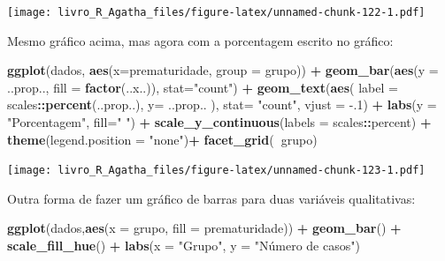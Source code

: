 \documentclass[
]{book}
\newenvironment{Shaded}{\begin{snugshade}}{\end{snugshade}}
\newcommand{\DataTypeTok}[1]{\textcolor[rgb]{0.13,0.29,0.53}{#1}}
\newcommand{\FloatTok}[1]{\textcolor[rgb]{0.00,0.00,0.81}{#1}}
\newcommand{\KeywordTok}[1]{\textcolor[rgb]{0.13,0.29,0.53}{\textbf{#1}}}
\newcommand{\NormalTok}[1]{#1}
\newcommand{\OperatorTok}[1]{\textcolor[rgb]{0.81,0.36,0.00}{\textbf{#1}}}
\newcommand{\StringTok}[1]{\textcolor[rgb]{0.31,0.60,0.02}{#1}}
\begin{document}
\texttt{[image: livro\_R\_Agatha\_files/figure-latex/unnamed-chunk-122-1.pdf]}

Mesmo gráfico acima, mas agora com a porcentagem escrito no gráfico:

\begin{Shaded}
\begin{Highlighting}[]
\KeywordTok{ggplot}\NormalTok{(dados, }\KeywordTok{aes}\NormalTok{(}\DataTypeTok{x=}\NormalTok{prematuridade, }\DataTypeTok{group =}\NormalTok{ grupo))  }\OperatorTok{+}\StringTok{ }
\StringTok{  }\KeywordTok{geom_bar}\NormalTok{(}\KeywordTok{aes}\NormalTok{(}\DataTypeTok{y =}\NormalTok{ ..prop.., }\DataTypeTok{fill =} \KeywordTok{factor}\NormalTok{(..x..)), }\DataTypeTok{stat=}\StringTok{"count"}\NormalTok{) }\OperatorTok{+}
\StringTok{  }\KeywordTok{geom_text}\NormalTok{(}\KeywordTok{aes}\NormalTok{( }\DataTypeTok{label =}\NormalTok{ scales}\OperatorTok{::}\KeywordTok{percent}\NormalTok{(..prop..),}
                 \DataTypeTok{y=}\NormalTok{ ..prop.. ), }\DataTypeTok{stat=} \StringTok{"count"}\NormalTok{, }\DataTypeTok{vjust =} \FloatTok{-.1}\NormalTok{) }\OperatorTok{+}
\StringTok{  }\KeywordTok{labs}\NormalTok{(}\DataTypeTok{y =} \StringTok{"Porcentagem"}\NormalTok{, }\DataTypeTok{fill=}\StringTok{" "}\NormalTok{) }\OperatorTok{+}
\StringTok{  }\KeywordTok{scale_y_continuous}\NormalTok{(}\DataTypeTok{labels =}\NormalTok{ scales}\OperatorTok{::}\NormalTok{percent) }\OperatorTok{+}
\StringTok{  }\KeywordTok{theme}\NormalTok{(}\DataTypeTok{legend.position =} \StringTok{"none"}\NormalTok{)}\OperatorTok{+}
\StringTok{  }\KeywordTok{facet_grid}\NormalTok{(}\OperatorTok{~}\NormalTok{grupo)}
\end{Highlighting}
\end{Shaded}

\texttt{[image: livro\_R\_Agatha\_files/figure-latex/unnamed-chunk-123-1.pdf]}

Outra forma de fazer um gráfico de barras para duas variáveis qualitativas:

\begin{Shaded}
\begin{Highlighting}[]
\KeywordTok{ggplot}\NormalTok{(dados,}\KeywordTok{aes}\NormalTok{(}\DataTypeTok{x =}\NormalTok{ grupo, }\DataTypeTok{fill =}\NormalTok{ prematuridade)) }\OperatorTok{+}
\StringTok{  }\KeywordTok{geom_bar}\NormalTok{() }\OperatorTok{+}
\StringTok{  }\KeywordTok{scale_fill_hue}\NormalTok{() }\OperatorTok{+}
\StringTok{  }\KeywordTok{labs}\NormalTok{(}\DataTypeTok{x =} \StringTok{"Grupo"}\NormalTok{, }\DataTypeTok{y =} \StringTok{"Número de casos"}\NormalTok{)}
\end{Highlighting}
\end{Shaded}
\end{document}
